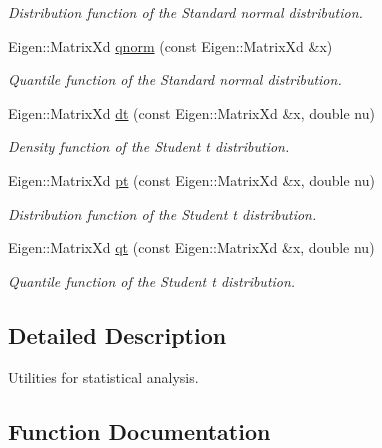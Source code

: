 \begin{DoxyCompactItemize}
\begin{DoxyCompactList}\small\item\em Distribution function of the Standard normal distribution. \end{DoxyCompactList}\item 
Eigen\+::\+Matrix\+Xd \hyperlink{namespacevinecopulib_1_1tools__stats_a4772a68417aa49b50e69c957db8533f7}{qnorm} (const Eigen\+::\+Matrix\+Xd \&x)
\begin{DoxyCompactList}\small\item\em Quantile function of the Standard normal distribution. \end{DoxyCompactList}\item 
Eigen\+::\+Matrix\+Xd \hyperlink{namespacevinecopulib_1_1tools__stats_abc09bc02add2d7b7781aa42a406be7d9}{dt} (const Eigen\+::\+Matrix\+Xd \&x, double nu)
\begin{DoxyCompactList}\small\item\em Density function of the Student t distribution. \end{DoxyCompactList}\item 
Eigen\+::\+Matrix\+Xd \hyperlink{namespacevinecopulib_1_1tools__stats_a1f65dc25a8284fe4629f092969e2861a}{pt} (const Eigen\+::\+Matrix\+Xd \&x, double nu)
\begin{DoxyCompactList}\small\item\em Distribution function of the Student t distribution. \end{DoxyCompactList}\item 
Eigen\+::\+Matrix\+Xd \hyperlink{namespacevinecopulib_1_1tools__stats_a17eb427c3a562c72d2e87438da1cd279}{qt} (const Eigen\+::\+Matrix\+Xd \&x, double nu)
\begin{DoxyCompactList}\small\item\em Quantile function of the Student t distribution. \end{DoxyCompactList}\end{DoxyCompactItemize}


\subsection{Detailed Description}
Utilities for statistical analysis. 

\subsection{Function Documentation}
\mbox{\label{namespacevinecopulib_1_1tools__stats_a249880b93e82211207869f94821de440}} 
